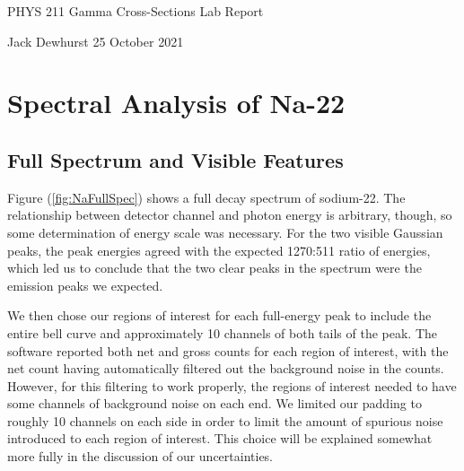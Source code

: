 \documentclass[letter]{article}
\begin{document}

\begin{center}
	{\large PHYS 211 Gamma Cross-Sections Lab Report}
	
	Jack Dewhurst \hspace{1cm}
	25 October 2021
	
	\vspace{5mm}
\end{center}
	


\section{Spectral Analysis of Na-22}

\subsection{Full Spectrum and Visible Features}



Figure (\ref{fig:NaFullSpec}) shows a full decay spectrum of sodium-22. The relationship between detector channel and photon energy is arbitrary, though, so some determination of energy scale was necessary. For the two visible Gaussian peaks, the peak energies agreed with the expected 1270:511 ratio of energies, which led us to conclude that the two clear peaks in the spectrum were the emission peaks we expected.

We then chose our regions of interest for each full-energy peak to include the entire bell curve and approximately 10 channels of both tails of the peak. The software reported both net and gross counts for each region of interest, with the net count having automatically filtered out the background noise in the counts. However, for this filtering to work properly, the regions of interest needed to have some channels of background noise on each end. We limited our padding to roughly 10 channels on each side in order to limit the amount of spurious noise introduced to each region of interest. This choice will be explained somewhat more fully in the discussion of our uncertainties.
\end{document}
